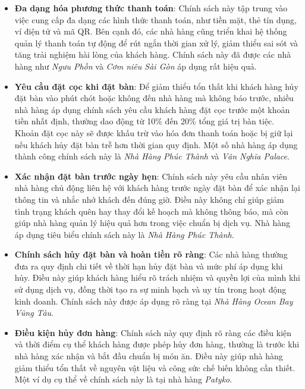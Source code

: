 \begin{itemize}
    \item \textbf{Đa dạng hóa phương thức thanh toán}: Chính sách này tập trung vào việc cung cấp đa dạng các hình thức thanh toán, như tiền mặt, thẻ tín dụng, ví điện tử và mã QR. Bên cạnh đó, các nhà hàng cũng triển khai hệ thống quản lý thanh toán tự động để rút ngắn thời gian xử lý, giảm thiểu sai sót và tăng trải nghiệm hài lòng của khách hàng. Chính sách này đã được các nhà hàng như \textit{Ngưu Phồn} và \textit{Cơm niêu Sài Gòn} áp dụng rất hiệu quả.
    
    \item \textbf{Yêu cầu đặt cọc khi đặt bàn}: Để giảm thiểu tổn thất khi khách hàng hủy đặt bàn vào phút chót hoặc không đến nhà hàng mà không báo trước, nhiều nhà hàng áp dụng chính sách yêu cầu khách hàng đặt cọc trước một khoản tiền nhất định, thường dao động từ 10\% đến 20\% tổng giá trị bàn tiệc. Khoản đặt cọc này sẽ được khấu trừ vào hóa đơn thanh toán hoặc bị giữ lại nếu khách hủy đặt bàn trễ hơn thời gian quy định. Một số nhà hàng áp dụng thành công chính sách này là \textit{Nhà Hàng Phúc Thành} và \textit{Vân Nghĩa Palace}.
    
    \item \textbf{Xác nhận đặt bàn trước ngày hẹn}: Chính sách này yêu cầu nhân viên nhà hàng chủ động liên hệ với khách hàng trước ngày đặt bàn để xác nhận lại thông tin và nhắc nhở khách đến đúng giờ. Điều này không chỉ giúp giảm tình trạng khách quên hay thay đổi kế hoạch mà không thông báo, mà còn giúp nhà hàng quản lý hiệu quả hơn trong việc chuẩn bị dịch vụ. Nhà hàng áp dụng tiêu biểu chính sách này là \textit{Nhà Hàng Phúc Thành}.
    
    \item \textbf{Chính sách hủy đặt bàn và hoàn tiền rõ ràng}: Các nhà hàng thường đưa ra quy định chi tiết về thời hạn hủy đặt bàn và mức phí áp dụng khi hủy. Điều này giúp khách hàng hiểu rõ trách nhiệm và quyền lợi của mình khi sử dụng dịch vụ, đồng thời tạo ra sự minh bạch và uy tín trong hoạt động kinh doanh. Chính sách này được áp dụng rõ ràng tại \textit{Nhà Hàng Ocean Bay Vũng Tàu}.
    
    \item \textbf{Điều kiện hủy đơn hàng}: Chính sách này quy định rõ ràng các điều kiện và thời điểm cụ thể khách hàng được phép hủy đơn hàng, thường là trước khi nhà hàng xác nhận và bắt đầu chuẩn bị món ăn. Điều này giúp nhà hàng giảm thiểu tổn thất về nguyên vật liệu và công sức chế biến không cần thiết. Một ví dụ cụ thể về chính sách này là tại nhà hàng \textit{Patyko}.
    

\end{itemize}
